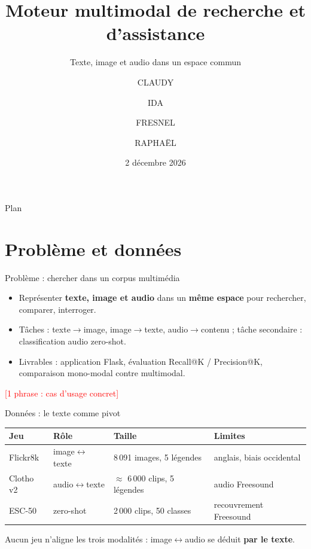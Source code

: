 \documentclass[aspectratio=169,11pt]{beamer}
\title[Moteur multimodal]{Moteur multimodal de recherche et d'assistance}
\subtitle{Texte, image et audio dans un espace commun}
\author[\'Equipe Projet 3]{CLAUDY \and IDA \and FRESNEL \and RAPHA\"EL}
\institute[ENSPY]{ENSPY -- INF50101 -- Projet 3}
\date{2 d\'ecembre 2026}
\newcommand{\TODO}[1]{\textcolor{red}{[#1]}}
\begin{document}
\begin{frame}\titlepage\end{frame}

\begin{frame}{Plan}
  \tableofcontents
\end{frame}

\section{Problème et données}
\begin{frame}{Problème : chercher dans un corpus multimédia}
  \begin{itemize}
    \item Représenter \textbf{texte, image et audio} dans un \textbf{même espace} pour rechercher, comparer, interroger.
    \item Tâches : texte$\to$image, image$\to$texte, audio$\to$contenu ; tâche secondaire : classification audio zero-shot.
    \item Livrables : application Flask, évaluation Recall@K / Precision@K, comparaison mono-modal contre multimodal.
  \end{itemize}
  \TODO{1 phrase : cas d'usage concret}
\end{frame}

\begin{frame}{Données : le texte comme pivot}
  \begin{center}\small
  \begin{tabular}{llll}
    \toprule
    Jeu & Rôle & Taille & Limites\\
    \midrule
    Flickr8k & image$\leftrightarrow$texte & 8\,091 images, 5 légendes & anglais, biais occidental\\
    Clotho v2 & audio$\leftrightarrow$texte & $\approx$ 6\,000 clips, 5 légendes & audio Freesound\\
    ESC-50 & zero-shot & 2\,000 clips, 50 classes & recouvrement Freesound\\
    \bottomrule
  \end{tabular}
  \end{center}
  Aucun jeu n'aligne les trois modalités : image$\leftrightarrow$audio se déduit \textbf{par le texte}.
\end{frame}
\end{document}
